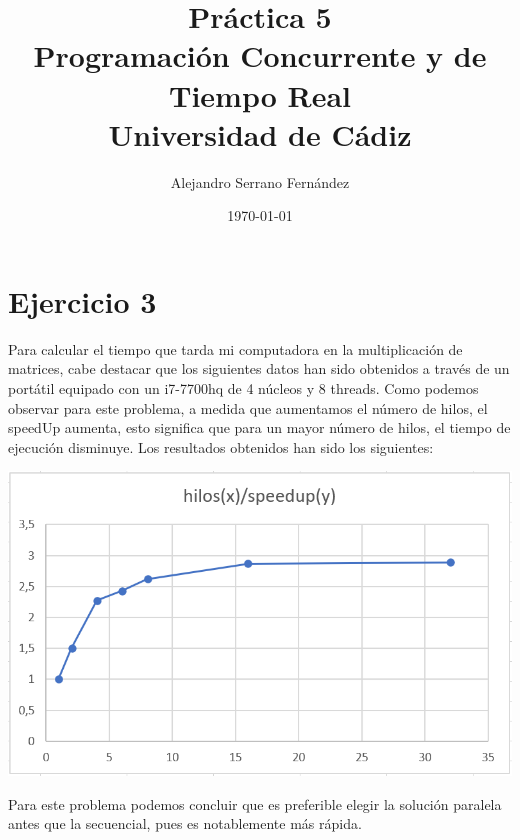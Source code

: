 \documentclass{article}
\title{Práctica 5 \\ Programación Concurrente y de Tiempo Real \\Universidad de Cádiz} %
\author{Alejandro Serrano Fernández} %
\date{\today} %
\begin{document}
\maketitle %


\section{Ejercicio 3}
Para calcular el tiempo que tarda mi computadora en la multiplicación de matrices, cabe destacar que los siguientes datos han sido obtenidos a través de un portátil equipado con un i7-7700hq de 4 núcleos y 8 threads. Como podemos observar para este problema, a medida que aumentamos el número de hilos, el speedUp aumenta, esto significa que para un mayor número de hilos, el tiempo de ejecución disminuye. Los resultados obtenidos han sido los siguientes:

\hfill \break
\begin{center}
\includegraphics[scale=0.5]{grafico-ejercicio3.png}
\end{center}
Para este problema podemos concluir que es preferible elegir la solución paralela antes que la secuencial, pues es notablemente más rápida.
\end{document}
